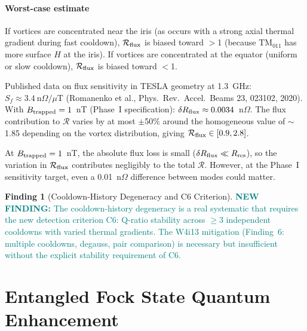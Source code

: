\documentclass[11pt]{article}
\newcommand{\newfinding}[1]{\textcolor{teal}{\textbf{NEW FINDING:} #1}}
\theoremstyle{definition}
\newtheorem{finding}[theorem]{Finding}
\theoremstyle{remark}
\begin{document}
\subsection{Worst-case estimate}

If vortices are concentrated near the iris (as occurs with a strong
axial thermal gradient during fast cooldown), $\mathcal{R}_{\rm flux}$
is biased toward $>$1 (because TM$_{011}$ has more surface $H$ at the
iris). If vortices are concentrated at the equator (uniform or slow
cooldown), $\mathcal{R}_{\rm flux}$ is biased toward $<$1.

Published data on flux sensitivity in TESLA geometry at 1.3~GHz:
$S_f \approx 3.4~\text{n}\Omega/\mu\text{T}$ (Romanenko et al.,
Phys.\ Rev.\ Accel.\ Beams 23, 023102, 2020). With $B_{\rm trapped}
= 1$~nT (Phase~I specification): $\delta R_{\rm flux} \approx
0.0034$~n$\Omega$. The flux contribution to $\mathcal{R}$ varies by
at most $\pm$50\% around the homogeneous value of $\sim$1.85 depending
on the vortex distribution, giving $\mathcal{R}_{\rm flux} \in
[0.9, 2.8]$.

At $B_{\rm trapped} = 1$~nT, the absolute flux loss is small
($\delta R_{\rm flux} \ll R_{\rm res}$), so the variation in
$\mathcal{R}_{\rm flux}$ contributes negligibly to the total
$\mathcal{R}$. However, at the Phase~I sensitivity target, even
a 0.01~n$\Omega$ difference between modes could matter.

\begin{finding}[Cooldown-History Degeneracy and C6 Criterion]
\label{find:cooldown}
\newfinding{The cooldown-history degeneracy is a real systematic that
requires the new detection criterion C6: Q-ratio stability across
$\geq$3 independent cooldowns with varied thermal gradients. The W4i13
mitigation (Finding~6: multiple cooldowns, degauss, pair comparison)
is necessary but insufficient without the explicit stability
requirement of C6.}
\end{finding}


\part{Entangled Fock State Quantum Enhancement}
\label{part:fock}
\end{document}

